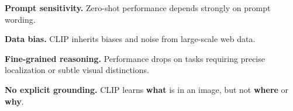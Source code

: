 \textbf{Prompt sensitivity.}
Zero-shot performance depends strongly on prompt wording.

\textbf{Data bias.}
CLIP inherits biases and noise from large-scale web data.

\textbf{Fine-grained reasoning.}
Performance drops on tasks requiring precise localization
or subtle visual distinctions.

\textbf{No explicit grounding.}
CLIP learns \textbf{what} is in an image,
but not \textbf{where} or \textbf{why}.
